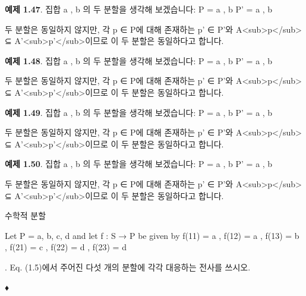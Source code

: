 \documentclass[11pt, a4paper, twoside, openany]{book}
\begin{document}
\par\medskip
\textbf{예제 1.47}. 집합 { a , b }의 두 분할을 생각해 보겠습니다:
P = { { a } , { b } }
P' = { { a , b } }

\par\medskip
두 분할은 동일하지 않지만, 각 p ∈ P\hspace{0pt}에 대해 존재하는 p' ∈ P'와 A<sub>p</sub> ⊆ A'<sub>p'</sub>이므로 이 두 분할은 동일하다고 합니다.

\par\medskip
\textbf{예제 1.48}. 집합 { a , b }의 두 분할을 생각해 보겠습니다:
P = { { a } , { b } }
P' = { { a , b } }

\par\medskip
두 분할은 동일하지 않지만, 각 p ∈ P\hspace{0pt}에 대해 존재하는 p' ∈ P'와 A<sub>p</sub> ⊆ A'<sub>p'</sub>이므로 이 두 분할은 동일하다고 합니다.

\par\medskip
\textbf{예제 1.49}. 집합 { a , b }의 두 분할을 생각해 보겠습니다:
P = { { a } , { b } }
P' = { { a , b } }

\par\medskip
두 분할은 동일하지 않지만, 각 p ∈ P\hspace{0pt}에 대해 존재하는 p' ∈ P'와 A<sub>p</sub> ⊆ A'<sub>p'</sub>이므로 이 두 분할은 동일하다고 합니다.

\par\medskip
\textbf{예제 1.50}. 집합 { a , b }의 두 분할을 생각해 보겠습니다:
P = { { a } , { b } }
P' = { { a , b } }

\par\medskip
두 분할은 동일하지 않지만, 각 p ∈ P\hspace{0pt}에 대해 존재하는 p' ∈ P'와 A<sub>p</sub> ⊆ A'<sub>p'</sub>이므로 이 두 분할은 동일하다고 합니다.

\par\medskip
수학적 분할

\par\medskip
Let P = {a, b, c, d} and let f : S → P be given
by
f(11) = a ,
f(12) = a ,
f(13) = b ,
f(21) = c ,
f(22) = d ,
f(23) = d

\par\medskip
\begin{exercisebox}[Exercise 1.27]
.
Eq. (1.5)에서 주어진 다섯 개의 분할에 각각 대응하는 전사를 쓰시오.
\end{exercisebox}

\par\medskip
♦
\end{document}
